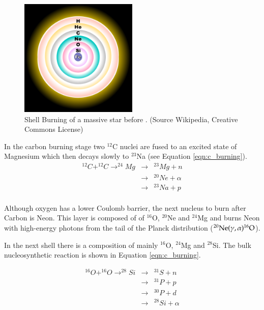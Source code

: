 \begin{figure}[htbp] %
   \centering
   \includegraphics[width=0.5\textwidth]{chapter_intro/plots/fusion_shells.pdf} 
   \caption{Shell Burning of a massive star before \snii. (Source  Wikipedia, Creative Commons License)}
   \label{fig:fusion_shells}
\end{figure}


In the carbon burning stage two $^{12}$C nuclei are fused to an excited state of Magnesium which then decays slowly to $^{23}$Na (see Equation \ref{eqn:c_burning}).
\begin{eqnarray}
^{12}C+^{12}C\rightarrow^{24}Mg&\rightarrow&^{23}Mg+n \nonumber \\
	&\rightarrow&^{20}Ne + \alpha \nonumber \\
	&\rightarrow&^{23}Na +p \nonumber \\
	\label{eqn:c_burning}
\end{eqnarray}

Although oxygen has a lower Coulomb barrier, the next nucleus to burn after Carbon is Neon. This layer is composed of of  $^{16}$O, $^{20}$Ne and $^{24}$Mg and burns Neon with high-energy photons from the tail of the Planck distribution ($\rm ^{20}Ne(\gamma,\alpha)^{16}O$). 

In the next shell there is a composition of mainly $^{16}$O, $^{24}$Mg and $^{28}$Si. The bulk nucleosynthetic reaction is shown in Equation \ref{eqn:c_burning}. 

\begin{eqnarray}
^{16}O+^{16}O\rightarrow^{28}Si&\rightarrow&^{31}S+n \nonumber \\
	&\rightarrow&^{31}P + p \nonumber \\
	&\rightarrow&^{30}P + d \nonumber \\
	&\rightarrow&^{28}Si + \alpha \nonumber \\
	\label{eqn:c_burning}
\end{eqnarray}

